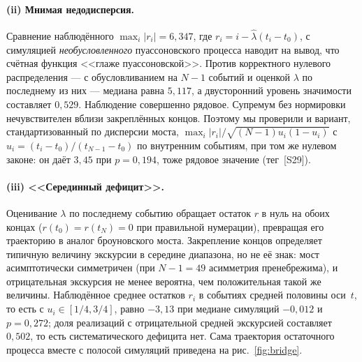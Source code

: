\documentclass[11pt,a4paper]{article}
\theoremstyle{plain}
\theoremstyle{remark}
\begin{document}
\paragraph{(ii) Мнимая недодисперсия.} Сравнение наблюдённого $\max_i|r_i|=6{,}347$,
где $r_i=i-\hat\lambda(t_i-t_0)$, с симуляцией \emph{необусловленного} пуассоновского
процесса наводит на вывод, что счётная функция <<глаже пуассоновской>>. Против
корректного нулевого распределения --- с обусловливанием на $N-1$ событий и оценкой
$\lambda$ по последнему из них --- медиана равна $5{,}117$, а двусторонний уровень
значимости составляет $0{,}529$. Наблюдение совершенно рядовое. Супремум без
нормировки нечувствителен вблизи закреплённых концов. Поэтому мы проверили и
вариант, стандартизованный по дисперсии моста,
$\max_i|r_i|/\sqrt{(N-1)u_i(1-u_i)}$ с $u_i=(t_i-t_0)/(t_{N-1}-t_0)$ по внутренним
событиям, при том же нулевом законе: он даёт $3{,}45$ при $p=0{,}194$, тоже рядовое
значение (тег~[S29]).

\paragraph{(iii) <<Серединный дефицит>>.} Оценивание $\lambda$ по последнему событию
обращает остаток $r$ в нуль на обоих концах ($r(t_0)=r(t_N)=0$ при правильной
нумерации), превращая его траекторию в аналог броуновского моста. Закрепление
концов определяет типичную величину экскурсии в середине диапазона, но не её знак:
мост асимптотически симметричен (при $N-1=49$ асимметрия пренебрежима), и
отрицательная экскурсия не менее вероятна, чем положительная такой же величины.
Наблюдённое среднее остатков $r_i$ в событиях средней половины оси~$t$, то есть с
$u_i\in[1/4,3/4]$, равно $-3{,}13$ при медиане симуляций
$-0{,}012$ и $p=0{,}272$; доля реализаций с отрицательной средней экскурсией
составляет $0{,}502$, то есть систематического дефицита нет. Сама траектория
остаточного процесса вместе с полосой симуляций приведена на
рис.~\ref{fig:bridge}.
\end{document}
